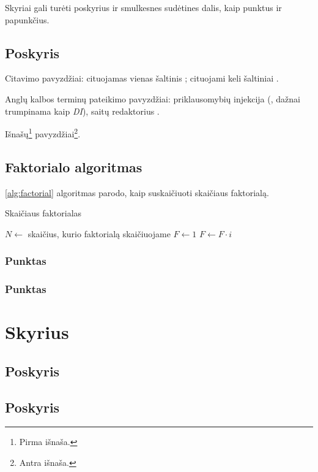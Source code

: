 \documentclass[
]{VUMIFPSbakalaurinis}
\begin{document}
Skyriai gali turėti poskyrius ir smulkesnes sudėtines dalis, kaip punktus ir
papunkčius.

\subsection{Poskyris}
Citavimo pavyzdžiai: cituojamas vienas šaltinis \cite{PvzStraipsnLt}; cituojami
keli šaltiniai \cite{PvzStraipsnEn, PvzStraipsnLta, PvzKonfLt, PvzKonfEn, PvzKnygLt, PvzKnygEn,
PvzElPubLt, PvzElPubEn, PvzBakLt, PvzMagistrLt, PvzPhdEn}.

Anglų kalbos terminų pateikimo pavyzdžiai: priklausomybių injekcija (,
dažnai trumpinama kaip \textit{DI}), saitų redaktorius .

Išnašų\footnote{Pirma išnaša.} pavyzdžiai\footnote{Antra išnaša.}.

\subsection{Faktorialo algoritmas}

\ref{alg:factorial} algoritmas parodo, kaip suskaičiuoti skaičiaus faktorialą.

\begin{algorithm}
\caption{Skaičiaus faktorialas}
\begin{algorithmic}[1] %
\State $N\gets$ skaičius, kurio faktorialą skaičiuojame
\State $F\gets 1$
    \State $F\gets F \cdot i$
\EndFor
\end{algorithmic}
\label{alg:factorial}
\end{algorithm}

\subsubsection{Punktas}
\subsubsection{Punktas}
\section{Skyrius}
\subsection{Poskyris}
\subsection{Poskyris}
\end{document}
